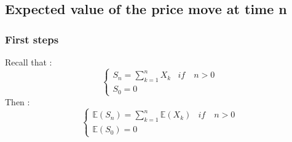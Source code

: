 \documentclass{article}
\begin{document}
\subsection{Expected value of the price move at time n}
\subsubsection{First steps}
Recall that :
\begin{equation*}
	\begin{cases}
        S_{n} = \sum_{k=1}^{n}X_k & if \quad n > 0 \\
        S_0 = 0
     \end{cases}
\end{equation*}
Then :
\begin{equation*}
	\begin{cases}
        \mathbb{E}(S_{n}) = \sum_{k=1}^{n}\mathbb{E}(X_k) & if \quad n > 0 \\
        \mathbb{E}(S_0) = 0
     \end{cases}
\end{equation*}
\end{document}
